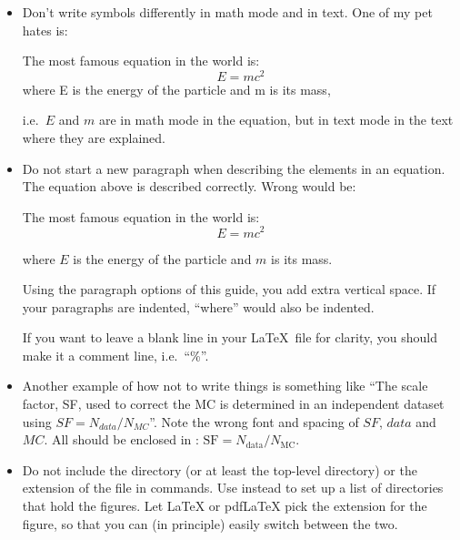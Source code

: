 \begin{itemize}
\item Don't write symbols differently in math mode and in text. One of
  my pet hates is:
  \begin{displayquote}
  The most famous equation in the world is:
  \begin{equation}
    \label{eq:emc1}
    E = m c^{2}
  \end{equation}
  where E is the energy of the particle and m is its mass,    
  \end{displayquote}
  i.e.\ \(E\) and \(m\) are in math mode in the equation,
  but in text mode in the text where they are explained.

\item Do not start a new paragraph when describing the elements in an equation.
  The equation above is described correctly. Wrong would be:
  \begin{displayquote}
    The most famous equation in the world is:
  \begin{equation}
    \label{eq:emc2}
    E = m c^{2}
  \end{equation}

  \hspace*{1em}where \(E\) is the energy of the particle and \(m\) is its mass.
  \end{displayquote}
  Using the paragraph options of this guide, you add extra vertical space.
  If your paragraphs are indented, \enquote{where} would also be indented.

  If you want to leave a blank line in your \LaTeX\ file for clarity,
  you should make it a comment line, i.e.\ \enquote{\%}.

\item Another example of how not to write things is something like
  \enquote{The scale factor, SF, used to correct the MC is determined in
  an independent dataset using \(SF = N_{data} / N_{MC}\)}. Note the
  wrong font and spacing of \(SF\), \(data\) and \(MC\). All should be
  enclosed in : \(\text{SF} = N_{\text{data}} / N_{\text{MC}}\).

\item Do not include the directory (or at least the top-level directory)
  or the extension of the file in  commands.
  Use 
  instead to set up a list of directories that hold the
  figures. Let \LaTeX{} or pdf\LaTeX{} pick
  the extension for the figure, so that you can (in principle) easily
  switch between the two.


\end{itemize}
